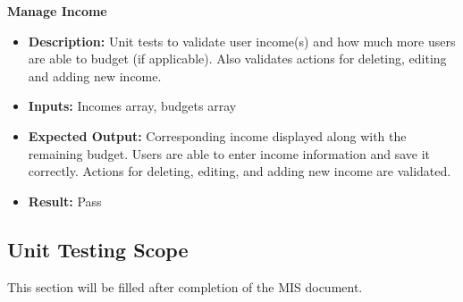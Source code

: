 \documentclass[12pt, titlepage]{article}
\begin{document}
\textbf{Manage Income}

\begin{itemize}
  \item \textbf{Description:} Unit tests to validate user income(s) and how much more users are able to budget (if applicable). Also validates actions for deleting, editing and adding
  new income.
  \item \textbf{Inputs:} Incomes array, budgets array
  \item \textbf{Expected Output:} Corresponding income displayed along with the remaining budget. Users are able to enter income information and save it correctly. 
  Actions for deleting, editing, and adding new income are validated.
  \item \textbf{Result:} Pass
\end{itemize}



\subsection{Unit Testing Scope}

This section will be filled after completion of the MIS document.

\end{document}
